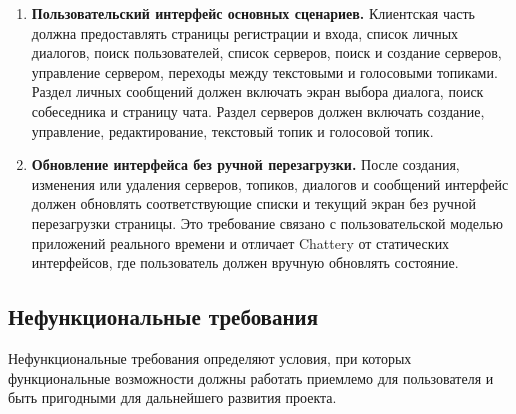 \documentclass[a4paper,12pt]{extarticle}
\begin{document}
\begin{enumerate}
    \item [F-11] \textbf{Пользовательский интерфейс основных сценариев.} Клиентская часть должна предоставлять страницы регистрации и входа, список личных диалогов, поиск пользователей, список серверов, поиск и создание серверов, управление сервером, переходы между текстовыми и голосовыми топиками. Раздел личных сообщений должен включать экран выбора диалога, поиск собеседника и страницу чата. Раздел серверов должен включать создание, управление, редактирование, текстовый топик и голосовой топик.

    \item [F-12] \textbf{Обновление интерфейса без ручной перезагрузки.} После создания, изменения или удаления серверов, топиков, диалогов и сообщений интерфейс должен обновлять соответствующие списки и текущий экран без ручной перезагрузки страницы. Это требование связано с пользовательской моделью приложений реального времени и отличает Chattery от статических интерфейсов, где пользователь должен вручную обновлять состояние.
\end{enumerate}

\subsection{Нефункциональные требования}

Нефункциональные требования определяют условия, при которых функциональные возможности должны работать приемлемо для пользователя и быть пригодными для дальнейшего развития проекта.
\end{document}
